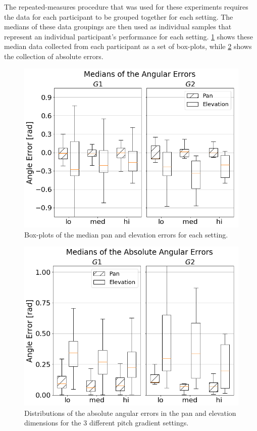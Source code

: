 \documentclass[]{interact}
\begin{document}
The repeated-measures procedure that was used for these experiments requires the data for each participant to be grouped together for each setting.
The medians of these data groupings are then used as individual samples that represent an individual participant's performance for each setting.
\cref{fig:target-boxplot-error} shows these median data collected from each participant as a set of box-plots, while \cref{fig:target-boxplot-absolute-errors} shows the collection of absolute errors.

\begin{figure}
  \centering
  \includegraphics[width=1.0\textwidth]{figures/boxplot_target_search_median_error.png}
  \caption{Box-plots of the median pan and elevation errors for each setting. }\label{fig:target-boxplot-error}
\end{figure}

\begin{figure}
  \centering
  \includegraphics[width=1.0\textwidth]{figures/boxplot_target_search_absolute_median_error.png}
  \caption{Distributions of the absolute angular errors in the pan and elevation dimensions for the 3 different pitch gradient settings. }\label{fig:target-boxplot-absolute-errors}
\end{figure}
\end{document}
